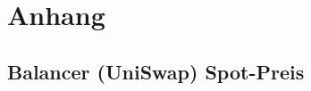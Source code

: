\documentclass[12pt,a4paper,titlepage,oneside,english]{article}
\begin{document}





\newpage
\section{Anhang}


\subsection{Balancer (UniSwap) Spot-Preis}
\label{sec:Herleitung Balancer Spot-Preis}
\end{document}
